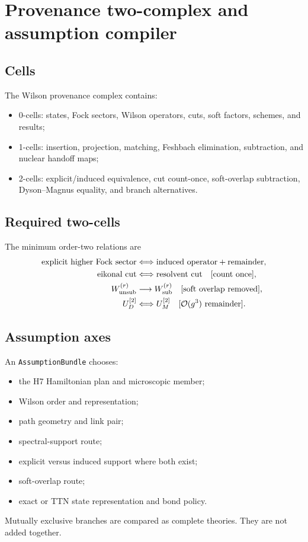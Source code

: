 \documentclass[11pt]{article}
\newcommand{\AssumptionBundle}{\texttt{AssumptionBundle}}
\begin{document}
\section{Provenance two-complex and assumption compiler}
\label{sec:provenance}

\subsection{Cells}

The Wilson provenance complex contains:
\begin{itemize}
 \item 0-cells: states, Fock sectors, Wilson operators, cuts, soft factors,
 schemes, and results;
 \item 1-cells: insertion, projection, matching, Feshbach elimination,
 subtraction, and nuclear handoff maps;
 \item 2-cells: explicit/induced equivalence, cut count-once, soft-overlap
 subtraction, Dyson--Magnus equality, and branch alternatives.
\end{itemize}

\subsection{Required two-cells}

The minimum order-two relations are
\begin{align}
 \text{explicit higher Fock sector}
 &\Longleftrightarrow
 \text{induced operator}+\text{remainder},
 \label{eq:explicit-induced-cell}\\
 \text{eikonal cut}
 &\Longleftrightarrow
 \text{resolvent cut}
 \quad[\text{count once}],
 \label{eq:cut-cell}\\
 W_{\rm unsub}^{(r)}
 &\longrightarrow
 W_{\rm sub}^{(r)}
 \quad[\text{soft overlap removed}],
 \label{eq:soft-cell}\\
 U_D^{[2]}
 &\Longleftrightarrow
 U_M^{[2]}
 \quad[\mathcal O(g^3)\text{ remainder}].
 \label{eq:dyson-magnus-cell}
\end{align}

\subsection{Assumption axes}

An \AssumptionBundle{} chooses:
\begin{itemize}
 \item the H7 Hamiltonian plan and microscopic member;
 \item Wilson order and representation;
 \item path geometry and link pair;
 \item spectral-support route;
 \item explicit versus induced support where both exist;
 \item soft-overlap route;
 \item exact or TTN state representation and bond policy.
\end{itemize}
Mutually exclusive branches are compared as complete theories.  They are not
added together.
\end{document}
